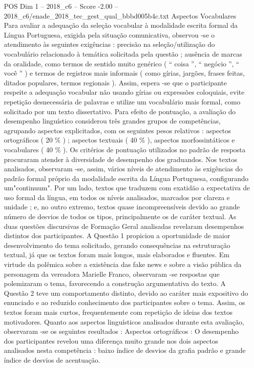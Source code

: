\begin{textsample}{POS Dim 1 – 2018\_c6 – Score -2.00 – 2018\_c6/enade\_2018\_tec\_gest\_qual\_bbbd005b4c.txt}
Aspectos Vocabulares Para avaliar a adequação da seleção vocabular à modalidade escrita formal da Língua Portuguesa, exigida pela situação comunicativa, observou -se o atendimento às seguintes exigências : precisão na seleção/utilização do vocabulário relacionado à temática solicitada pela questão ; ausência de marcas da oralidade, como termos de sentido muito genérico ( “ coisa ”, “ negócio ”, “ você ” ) e termos de registros mais informais ( como gírias, jargões, frases feitas, ditados populares, termos regionais ).
Assim, espera -se que o participante respeite a adequação vocabular não usando gírias ou expressões coloquiais, evite repetição desnecessária de palavras e utilize um vocabulário mais formal, como solicitado por um texto dissertativo.
Para efeito de pontuação, a avaliação do desempenho linguístico considerou três grandes grupos de competências, agrupando aspectos explicitados, com os seguintes pesos relativos : aspectos ortográficos ( 20 \% ) ; aspectos textuais ( 40 \% ), aspectos morfossintáticos e vocabulares ( 40 \% ).
Os critérios de pontuação utilizados no padrão de resposta procuraram atender à diversidade de desempenho dos graduandos.
Nos textos analisados, observaram -se, assim, vários níveis de atendimento às exigências do padrão formal próprio da modalidade escrita da Língua Portuguesa, configurando um"continuum".
Por um lado, textos que traduzem com exatidão a expectativa de uso formal da língua, em todos os níveis analisados, marcados por clareza e unidade ; e, no outro extremo, textos quase incompreensíveis devido ao grande número de desvios de todos os tipos, principalmente os de caráter textual.
As duas questões discursivas de Formação Geral analisadas revelaram desempenhos distintos dos participantes.
A Questão 1 propiciou a oportunidade de maior desenvolvimento do tema solicitado, gerando consequências na estruturação textual, já que os textos foram mais longos, mais elaborados e fluentes.
Em virtude da polêmica sobre a existência das fake news e sobre a visão pública da personagem da vereadora Marielle Franco, observaram -se respostas que polemizaram o tema, favorecendo a construção argumentativa do texto.
A Questão 2 teve um comportamento distinto, devido ao caráter mais expositivo do enunciado e ao reduzido conhecimento dos participantes sobre o tema.
Assim, os textos foram mais curtos, frequentemente com repetição de ideias dos textos motivadores.
Quanto aos aspectos linguísticos analisados durante esta avaliação, observaram -se os seguintes resultados : Aspectos ortográficos : O desempenho dos participantes revelou uma diferença muito grande nos dois aspectos analisados nesta competência : baixo índice de desvios da grafia padrão e grande índice de desvios de acentuação.

\end{textsample}
